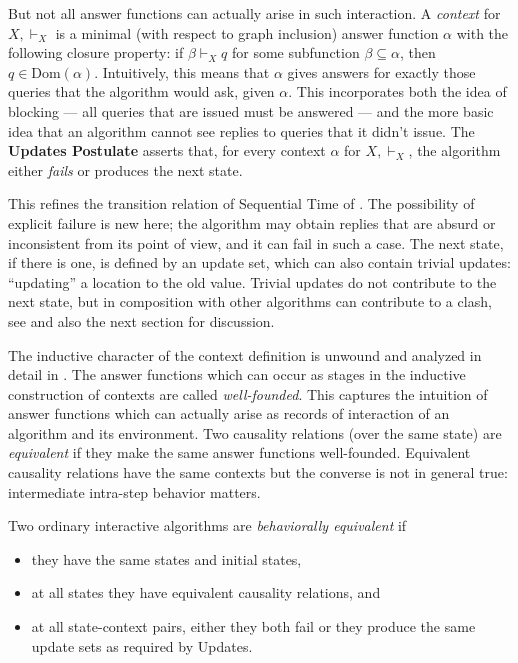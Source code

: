 \documentclass{LMCS}
\theoremstyle{definition}
\newcommand{\dom}[1]{\ensuremath{{\text{Dom}}(#1)}}
\begin{document}
But not all answer functions can actually arise in such interaction.  A
\emph{context} for $X,\vdash_X$ is a minimal (with respect to graph
inclusion) answer function $\alpha$ with the following closure property:
if $\beta \vdash_X q$ for some subfunction $\beta \subseteq \alpha$, then
$q \in \dom{\alpha}$.  Intuitively, this means that $\alpha$ gives answers
for exactly those queries that the algorithm would ask, given $\alpha$.
This incorporates both the idea of blocking --- all queries that are
issued must be answered --- and the more basic idea that an algorithm
cannot see replies to queries that it didn't issue.  The \textbf{Updates
Postulate} asserts that, for every context $\alpha$ for $X,\vdash_X$, the
algorithm either \emph{fails} or produces the next state.

This refines the transition relation of Sequential Time of \cite{seqth}.
The possibility of explicit failure is new here; the algorithm may obtain
replies that are absurd or inconsistent from its point of
view, and it can fail in such a case.  The next state, if there is one, is
defined by an update set, which can also contain trivial updates:
``updating'' a location to the old value.  Trivial updates do not
contribute to the next state, but in composition with other algorithms can
contribute to a clash, see \cite{oa1} and also the next section for
discussion.

The inductive character of the context definition is unwound and analyzed
in detail in \cite{oa1}. The answer functions which can occur as stages in
the inductive construction of contexts are called
\emph{well-founded}. This captures the intuition of answer functions which
can actually arise as records of interaction of an algorithm and its
environment. Two causality relations (over the same state) are
\emph{equivalent} if they make the same answer functions well-founded.
Equivalent causality relations have the same contexts but the converse is
not in general true: intermediate intra-step behavior matters.

Two ordinary interactive algorithms are \emph{behaviorally
equivalent} if
\begin{itemize}
\item they have the same states and initial states,
\item at all states they have equivalent causality relations, and
\item at all state-context pairs, either they both fail or they produce
the same update sets as required by Updates.
\end{itemize}
\end{document}
